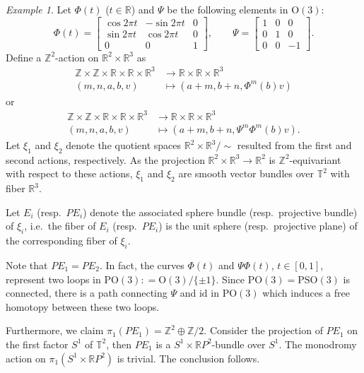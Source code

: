 \documentclass[12pt]{amsart}
\theoremstyle{plain}
\theoremstyle{definition}
\theoremstyle{question}
\theoremstyle{remark}
\theoremstyle{assumption}
\newtheorem{example}[theorem]{Example}
\numberwithin{equation}{section}
\theoremstyle{bigthm}
\begin{document}
\begin{example}\label{exa_S2_T2}
Let $\Phi (t)$ ($t \in \mathbb{R}$) and $\Psi$ be the following elements in $\mathrm{O} (3)$:
\[
\Phi (t) =
\begin{bmatrix}
\cos 2 \pi t & - \sin 2 \pi t & 0 \\
\sin 2 \pi t & \cos 2 \pi t & 0 \\
0 & 0 & 1
\end{bmatrix},
\qquad
\Psi =
\begin{bmatrix}
1 & 0 & 0 \\
0 & 1 & 0 \\
0 & 0 & -1
\end{bmatrix}.
\]
Define a $\mathbb{Z}^{2}$-action on $\mathbb{R}^{2} \times \mathbb{R}^{3}$ as
\begin{align*}
\mathbb{Z} \times \mathbb{Z} \times \mathbb{R} \times \mathbb{R} \times \mathbb{R}^{3} & \rightarrow \mathbb{R} \times \mathbb{R} \times \mathbb{R}^{3} \\
(m,n,a,b,v) & \mapsto (a+m, b+n, \Phi^{m} (b) v)
\end{align*}
or
\begin{align*}
\mathbb{Z} \times \mathbb{Z} \times \mathbb{R} \times \mathbb{R} \times \mathbb{R}^{3} & \rightarrow \mathbb{R} \times \mathbb{R} \times \mathbb{R}^{3} \\
(m,n,a,b,v) & \mapsto (a+m, b+n, \Psi^{m} \Phi^{m} (b) v).
\end{align*}
Let $\xi_{1}$ and $\xi_{2}$ denote the quotient spaces $\mathbb{R}^{2} \times \mathbb{R}^{3} / \sim$ resulted from the first and second actions, respectively. As the projection $\mathbb{R}^{2} \times \mathbb{R}^{3} \rightarrow \mathbb{R}^{2}$ is $\mathbb{Z}^{2}$-equivariant with respect to these actions, $\xi_{1}$ and $\xi_{2}$ are smooth vector bundles over $\mathbb{T}^{2}$ with fiber $\mathbb{R}^{3}$.

Let $E_{i}$ (resp.~$PE_{i}$) denote the associated sphere bundle (resp.~projective bundle) of $\xi_{i}$, i.e.~the fiber of $E_{i}$ (resp.~$PE_{i}$) is the unit sphere (resp.~projective plane) of the corresponding fiber of $\xi_{i}$.

Note that $PE_{1} = PE_{2}$. In fact, the curves $\Phi (t)$ and $\Psi \Phi (t)$, $t \in [0,1]$, represent two loops in $\mathrm{PO} (3) : = \mathrm{O}(3) /\{ \pm 1 \}$. Since $\mathrm{PO} (3) = \mathrm{PSO} (3)$ is connected, there is a path connecting $\Psi$ and $\mathrm{id}$ in $\mathrm{PO} (3)$ which induces a free homotopy between these two loops.

Furthermore, we claim $\pi_{1} (PE_{1}) = \mathbb{Z}^{2} \oplus \mathbb{Z} /2$. Consider the projection of $PE_{1}$ on the first factor $S^{1}$ of $\mathbb{T}^{2}$, then $PE_{1}$ is a $S^{1} \times \mathbb{R}P^{2}$-bundle over $S^{1}$. The monodromy action on $\pi_{1} (S^{1} \times \mathbb{R}P^{2})$ is trivial. The conclusion follows.
\end{example}
\end{document}

